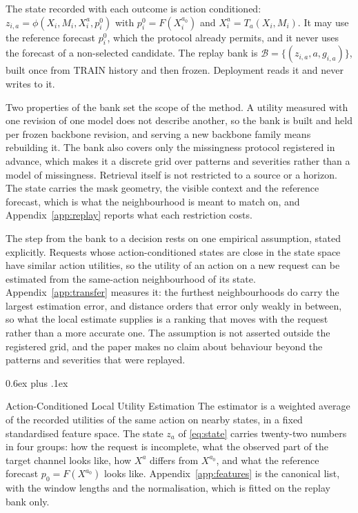 \documentclass{article}
\makeatletter
\newcommand{\calB}{\mathcal{B}}
\def\subsection{\@startsection{subsection}{2}{\z@}{-1.4ex plus -0.4ex minus -.2ex}%
  {0.6ex plus .1ex}{\normalsize\sc\raggedright}}
\makeatother
\begin{document}
The state recorded with each outcome is action conditioned:
$z_{i,a} = \phi(X_i, M_i, X_i^{a}, p_i^{0})$ with $p_i^{0} = F(X_i^{a_0})$ and
$X_i^{a} = T_a(X_i, M_i)$.\label{eq:state} It may use the reference forecast $p_i^0$, which the
protocol already permits, and it never uses the forecast of a non-selected candidate. The
replay bank is $\calB = \{(z_{i,a}, a, g_{i,a})\}$, built once from TRAIN history and then
frozen. Deployment reads it and never writes to it.

Two properties of the bank set the scope of the method. A utility measured with one revision
of one model does not describe another, so the bank is built and held per frozen backbone
revision, and serving a new backbone family means rebuilding it. The bank also covers only the
missingness protocol registered in advance, which makes it a discrete grid over patterns and
severities rather than a model of missingness. Retrieval itself is not restricted to a source
or a horizon. The state carries the mask geometry, the visible context and the reference
forecast, which is what the neighbourhood is meant to match on, and
Appendix~\ref{app:replay} reports what each restriction costs.

The step from the bank to a decision rests on one empirical assumption, stated explicitly.
Requests whose action-conditioned states are close in the state space have similar action
utilities, so the utility of an action on a new request can be estimated from the same-action
neighbourhood of its state. Appendix~\ref{app:transfer} measures it: the furthest
neighbourhoods do carry the largest estimation error, and distance orders that error only
weakly in between, so what the local estimate supplies is a ranking that moves with the
request rather than a more accurate one. The assumption is not asserted outside the registered
grid, and the paper makes no claim about behaviour beyond the patterns and severities that
were replayed.

\subsection{Action-Conditioned Local Utility Estimation}
\label{sec:method-scoring}
The estimator is a weighted average of the recorded utilities of the same action on nearby
states, in a fixed standardised feature space. The state $z_a$ of \eqref{eq:state} carries
twenty-two numbers in four groups: how the request is incomplete, what the observed part of the
target channel looks like, how $X^{a}$ differs from $X^{a_0}$, and what the reference forecast
$p_0 = F(X^{a_0})$ looks like. Appendix~\ref{app:features} is the canonical list, with the
window lengths and the normalisation, which is fitted on the replay bank only.
\end{document}
